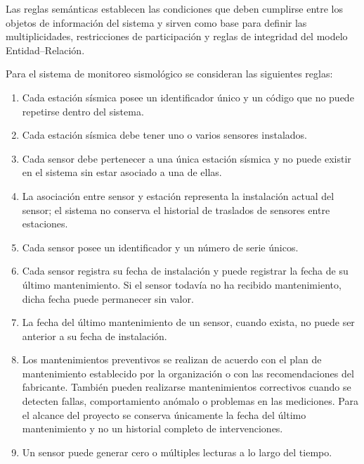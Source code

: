 \documentclass[12pt,a4paper]{article}
\begin{document}
Las reglas semánticas establecen las condiciones que deben cumplirse entre los objetos de información del sistema y sirven como base para definir las multiplicidades, restricciones de participación y reglas de integridad del modelo Entidad--Relación.

Para el sistema de monitoreo sismológico se consideran las siguientes reglas:

\begin{enumerate}

    \item Cada estación sísmica posee un identificador único y un código que no puede repetirse dentro del sistema.

    \item Cada estación sísmica debe tener uno o varios sensores instalados.

    \item Cada sensor debe pertenecer a una única estación sísmica y no puede existir en el sistema sin estar asociado a una de ellas.

    \item La asociación entre sensor y estación representa la instalación actual del sensor; el sistema no conserva el historial de traslados de sensores entre estaciones.

    \item Cada sensor posee un identificador y un número de serie únicos.

    \item Cada sensor registra su fecha de instalación y puede registrar la fecha de su último mantenimiento. Si el sensor todavía no ha recibido mantenimiento, dicha fecha puede permanecer sin valor.

    \item La fecha del último mantenimiento de un sensor, cuando exista, no puede ser anterior a su fecha de instalación.

    \item Los mantenimientos preventivos se realizan de acuerdo con el plan de mantenimiento establecido por la organización o con las recomendaciones del fabricante. También pueden realizarse mantenimientos correctivos cuando se detecten fallas, comportamiento anómalo o problemas en las mediciones. Para el alcance del proyecto se conserva únicamente la fecha del último mantenimiento y no un historial completo de intervenciones.

    \item Un sensor puede generar cero o múltiples lecturas a lo largo del tiempo.


\end{enumerate}
\end{document}
